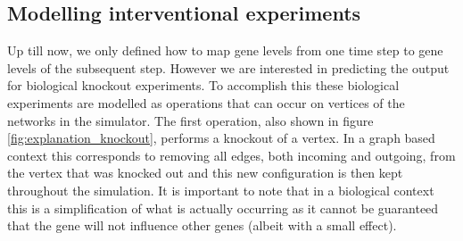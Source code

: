 \subsection{Modelling interventional experiments}
Up till now, we only defined how to map gene levels from one time step to gene levels of the subsequent step. However we are interested in predicting the output for biological knockout experiments. 
To accomplish this these biological experiments are modelled as operations that can occur on vertices of the networks in the simulator. The first operation, also shown in figure \ref{fig:explanation_knockout}, performs a knockout of a vertex. 
In a graph based context this corresponds to removing all edges, both incoming and outgoing, from the vertex that was knocked out\cite{ud2015optimal} and this new configuration is then kept throughout the simulation. It is important to note that
 in a biological context this is a simplification of what is actually occurring as it cannot be guaranteed that the gene will not influence other genes (albeit with a small effect).
